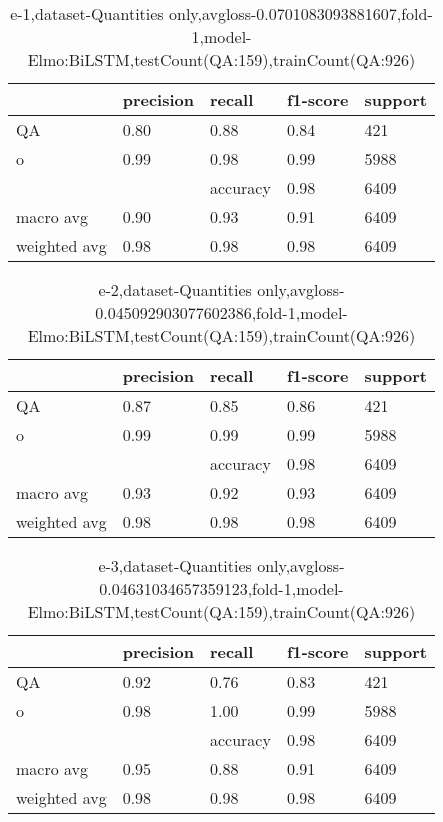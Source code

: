 \begin{table}[!ht] 
\centering
\caption{e-1,dataset-Quantities only,avgloss-0.0701083093881607,fold-1,model-Elmo:BiLSTM,testCount(QA:159),trainCount(QA:926)}\label{e-1data-quantS.tsv}
\begin{tabularx}{300pt}{|X|X|X|X|X|}
\hline
&precision&recall&f1-score&support\\
\hline
QA&0.80&0.88&0.84&421\\
\hline
o&0.99&0.98&0.99&5988\\
\hline
&&accuracy&0.98&6409\\
\hline
macro avg&0.90&0.93&0.91&6409\\
\hline
weighted avg&0.98&0.98&0.98&6409\\
\hline
\end{tabularx}
\end{table}
\begin{table}[!ht] 
\centering
\caption{e-2,dataset-Quantities only,avgloss-0.045092903077602386,fold-1,model-Elmo:BiLSTM,testCount(QA:159),trainCount(QA:926)}\label{e-2data-quantS.tsv}
\begin{tabularx}{300pt}{|X|X|X|X|X|}
\hline
&precision&recall&f1-score&support\\
\hline
QA&0.87&0.85&0.86&421\\
\hline
o&0.99&0.99&0.99&5988\\
\hline
&&accuracy&0.98&6409\\
\hline
macro avg&0.93&0.92&0.93&6409\\
\hline
weighted avg&0.98&0.98&0.98&6409\\
\hline
\end{tabularx}
\end{table}
\begin{table}[!ht] 
\centering
\caption{e-3,dataset-Quantities only,avgloss-0.04631034657359123,fold-1,model-Elmo:BiLSTM,testCount(QA:159),trainCount(QA:926)}\label{e-3data-quantS.tsv}
\begin{tabularx}{300pt}{|X|X|X|X|X|}
\hline
&precision&recall&f1-score&support\\
\hline
QA&0.92&0.76&0.83&421\\
\hline
o&0.98&1.00&0.99&5988\\
\hline
&&accuracy&0.98&6409\\
\hline
macro avg&0.95&0.88&0.91&6409\\
\hline
weighted avg&0.98&0.98&0.98&6409\\
\hline
\end{tabularx}
\end{table}
